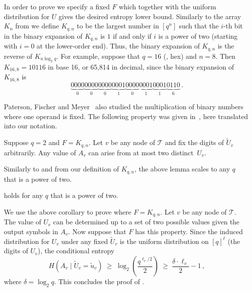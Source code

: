 \documentclass{toc}
\newcommand{\calT}{\ensuremath{\mathcal{T}}}
\newcommand{\Xv}{\ensuremath{U_v}}
\newcommand{\Xvknown}{\ensuremath{\widetilde{U}_v}}
\newcommand{\Xvfix}{\ensuremath{\widetilde{u}_v}}
\newcommand{\Yv}{\ensuremath{A_v}}
\begin{document}
In order to prove  we specify a fixed $F$ which together with the uniform distribution for $U$ gives the desired entropy lower bound.
Similarly to the array $K_n$ from  we define $K_{q,n}$ to be the largest number in $[q^n]$ such that the $i$-th bit in the binary expansion of $K_{q,n}$ is $1$ if and only if $i$ is a power of two (starting with $i=0$ at the lower-order end). Thus, the binary expansion of $K_{q,n}$ is the reverse of $K_{n\log_2 q}$.
For example, suppose that $q=16$ (\ie, hex) and $n=8$. Then $K_{16,8}=10116$ in base 16, or 65,814 in decimal, since the binary expansion of $K_{16,8}$ is
\[
\underbrace{0000}_{0}
\underbrace{0000}_{0}
\underbrace{0000}_{0}
\underbrace{0001}_{1}
\underbrace{0000}_{0}
\underbrace{0001}_{1}
\underbrace{0001}_{1}
\underbrace{0110}_{6}\,.
\]

Paterson, Fischer and Meyer~\cite{PFM:1974} also studied the multiplication of binary numbers where one operand is fixed. The following property was given in~\cite{PFM:1974}, here translated into our notation.

\begin{lemma}
	\label{lem:PFMlemma1}
	Suppose $q=2$ and $F=K_{q,n}$. Let $v$ be any node of $\calT$ and fix the digits of $\Xvknown$ arbitrarily. Any value of $A_v$ can arise from at most two distinct~$\Xv$.
\end{lemma}

Similarly to  and from our definition of $K_{q,n}$, the above lemma scales to any $q$ that is a power of two.

\begin{corollary}
	 holds for any $q$ that is a power of two.
\end{corollary}

We use the above corollary to prove  where $F=K_{q,n}$.
Let $v$ be any node of $\calT$.
The value of $\Xv$ can be determined up to a set of two possible values given the output symbols in $\Yv$. Now suppose that $F$ has this property.
Since the induced distribution for $\Xv$ under any fixed $\Xvknown$ is the uniform distribution on $[q]^\ell$ (the digits of $\Xv$), the conditional entropy
\[
H(\Yv\mid\Xvknown=\Xvfix)
\;\geq\;
\log_2 \left(\frac{q^{\ell_v / 2}}{2}\right)
\;\geq\;
\frac{\delta \cdot \ell_v}{2} - 1\,,
\]
where $\delta=\log_2 q$.
This concludes the proof of .
\end{document}

